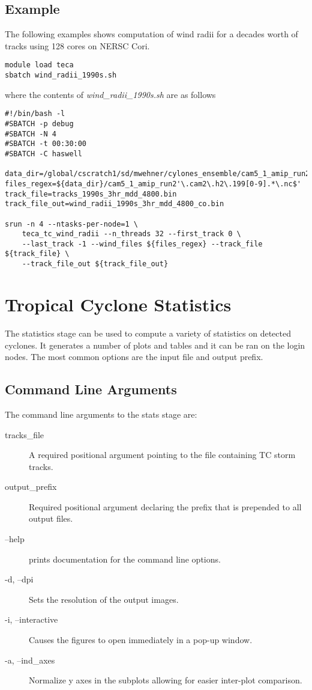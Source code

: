 \documentclass[a4paper,10pt,DIV=12]{scrreprt}
\begin{document}
\subsection{Example}
The following examples shows computation of wind radii for a decades worth of tracks using 128 cores on NERSC Cori.
\begin{verbatim}
module load teca
sbatch wind_radii_1990s.sh
\end{verbatim}
where the contents of \textit{wind\_radii\_1990s.sh} are as follows
\begin{verbatim}
#!/bin/bash -l
#SBATCH -p debug
#SBATCH -N 4
#SBATCH -t 00:30:00
#SBATCH -C haswell

data_dir=/global/cscratch1/sd/mwehner/cylones_ensemble/cam5_1_amip_run2/ncfiles
files_regex=${data_dir}/cam5_1_amip_run2'\.cam2\.h2\.199[0-9].*\.nc$'
track_file=tracks_1990s_3hr_mdd_4800.bin
track_file_out=wind_radii_1990s_3hr_mdd_4800_co.bin

srun -n 4 --ntasks-per-node=1 \
    teca_tc_wind_radii --n_threads 32 --first_track 0 \
    --last_track -1 --wind_files ${files_regex} --track_file ${track_file} \
    --track_file_out ${track_file_out}
\end{verbatim}


\section{Tropical Cyclone Statistics}
The statistics stage can be used to compute a variety of statistics on detected cyclones. It generates a number of plots and tables and it can be ran on the login nodes. The most common options are the input file and output prefix. 

\subsection{Command Line Arguments}
The command line arguments to the stats stage are:
\begin{description}
\item[tracks\_file] A required positional argument pointing to the file containing TC storm tracks.
\item[output\_prefix] Required positional argument declaring the prefix that is prepended to all output files.
\item[--help] prints documentation for the command line options.
\item[-d, --dpi] Sets the resolution of the output images.
\item[-i, --interactive] Causes the figures to open immediately in a pop-up window.
\item[-a, --ind\_axes] Normalize y axes in the subplots allowing for easier inter-plot comparison.
\end{description}
\end{document}
